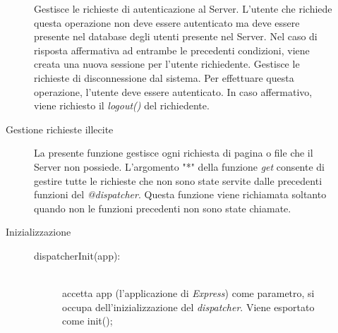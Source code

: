 \begin{description}
\begin{description}
\begin{mldescription}
 Gestisce le richieste di autenticazione al Server. L'utente che richiede questa operazione non deve essere autenticato ma deve essere presente nel database degli utenti presente nel Server. Nel caso di risposta affermativa ad entrambe le precedenti condizioni, viene creata una nuova sessione per l'utente richiedente.
 Gestisce le richieste di disconnessione dal sistema. Per effettuare questa operazione, l'utente deve essere autenticato. In caso affermativo, viene richiesto il \textit{logout()} del richiedente.
 \end{mldescription}

\item[Gestione richieste illecite]
 \begin{mldescription}
 La presente funzione gestisce ogni richiesta di pagina o file che il Server non possiede. L'argomento "*" della funzione \textit{get} consente di gestire tutte le richieste che non sono state servite dalle precedenti funzioni del \textit{@dispatcher}. Questa funzione viene richiamata soltanto quando non le funzioni precedenti non sono state chiamate.
 \end{mldescription}

\item[Inizializzazione] \hfill
 \begin{description}
  \item[dispatcherInit(app):] \hfill \\ 
  accetta app (l'applicazione di \textit{Express}) come parametro, si occupa dell'inizializzazione del \textit{dispatcher}. Viene esportato come init();
 \end{description}
\end{description}
\end{description}


